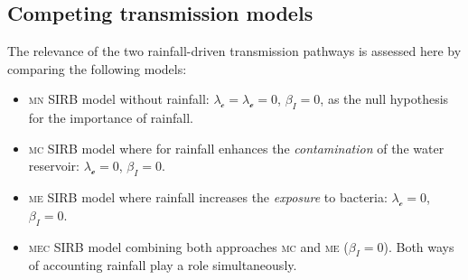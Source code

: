 \subsection{Competing transmission models}
The relevance of the two rainfall-driven transmission pathways is assessed here by comparing the following models:
\begin{itemize}
 \item \textsc{mn} SIRB model without rainfall: $\lambda_{\mathcal{c}} = \lambda_{\mathcal{e}} = 0$, $\beta_{I} = 0$, as the null hypothesis for the importance of rainfall.
  \item \textsc{mc} SIRB model where for rainfall enhances the \textit{contamination} of the water reservoir: $\lambda_{\mathcal{e}} = 0$, $\beta_{I} = 0$. 
  \item \textsc{me} SIRB model where rainfall increases the \textit{exposure} to bacteria: $\lambda_{\mathcal{c}} = 0$, $\beta_{I} = 0$. 
  \item \textsc{mec} SIRB model combining both approaches \textsc{mc} and \textsc{me} ($\beta_{I} = 0$). Both ways of accounting rainfall play a role simultaneously.
\end{itemize}
